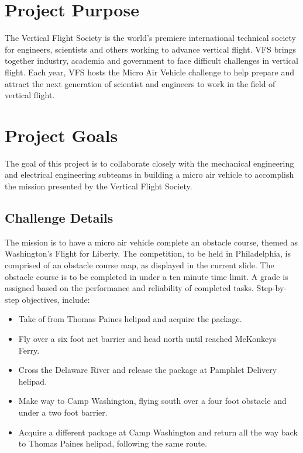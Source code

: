 \documentclass[onecolumn, oneside, letterpaper, draftclsnofoot, 10pt, compsoc]{IEEEtran}
\begin{document}
\section{Project Purpose}
The Vertical Flight Society is the world's premiere international technical society for engineers, scientists and others working to advance vertical flight. VFS brings together industry, academia and government to face difficult challenges in vertical flight. Each year, VFS hosts the Micro Air Vehicle challenge to help prepare and attract the next generation of scientist and engineers to work in the field of vertical flight.


\section{Project Goals}
The goal of this project is to collaborate closely with the mechanical engineering and electrical engineering subteams in building a micro air vehicle to accomplish the mission presented by the Vertical Flight Society.

\subsection{Challenge Details}
\noindent
The mission is to have a micro air vehicle complete an obstacle course, themed as Washington’s Flight for Liberty. The competition, to be held in Philadelphia, is comprised of an obstacle course map, as displayed in the current slide. The obstacle course is to be completed in under a ten minute time limit. A grade is assigned based on the performance and reliability of completed tasks. Step-by-step objectives, include:

\begin{itemize}
    \item Take of from Thomas Paine\textquotesingle s helipad and acquire the package.
    \item Fly over a six foot net barrier and head north until reached McKonkey\textquotesingle s Ferry.
    \item Cross the Delaware River and release the package at Pamphlet Delivery helipad.
    \item Make way to Camp Washington, flying south over a four foot obstacle and under a two foot barrier.
    \item Acquire a different package at Camp Washington and return all the way back to Thomas Paine\textquotesingle s helipad, following the same route.
\end{itemize}
\end{document}
